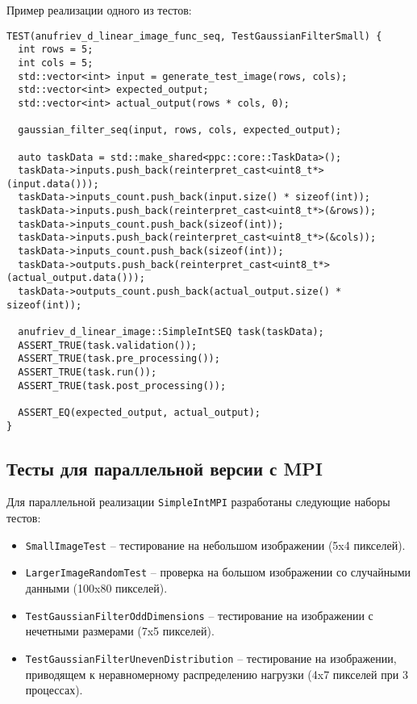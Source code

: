 \documentclass[12pt]{article}
\begin{document}
Пример реализации одного из тестов:
\begin{lstlisting}
TEST(anufriev_d_linear_image_func_seq, TestGaussianFilterSmall) {
  int rows = 5;
  int cols = 5;
  std::vector<int> input = generate_test_image(rows, cols);
  std::vector<int> expected_output;
  std::vector<int> actual_output(rows * cols, 0);

  gaussian_filter_seq(input, rows, cols, expected_output);

  auto taskData = std::make_shared<ppc::core::TaskData>();
  taskData->inputs.push_back(reinterpret_cast<uint8_t*>(input.data()));
  taskData->inputs_count.push_back(input.size() * sizeof(int));
  taskData->inputs.push_back(reinterpret_cast<uint8_t*>(&rows));
  taskData->inputs_count.push_back(sizeof(int));
  taskData->inputs.push_back(reinterpret_cast<uint8_t*>(&cols));
  taskData->inputs_count.push_back(sizeof(int));
  taskData->outputs.push_back(reinterpret_cast<uint8_t*>(actual_output.data()));
  taskData->outputs_count.push_back(actual_output.size() * sizeof(int));

  anufriev_d_linear_image::SimpleIntSEQ task(taskData);
  ASSERT_TRUE(task.validation());
  ASSERT_TRUE(task.pre_processing());
  ASSERT_TRUE(task.run());
  ASSERT_TRUE(task.post_processing());

  ASSERT_EQ(expected_output, actual_output);
}
\end{lstlisting}

\subsection{Тесты для параллельной версии с MPI}

Для параллельной реализации \texttt{SimpleIntMPI} разработаны следующие наборы тестов:

\begin{itemize}
    \item \texttt{SmallImageTest} – тестирование на небольшом изображении (5x4 пикселей).
    \item \texttt{LargerImageRandomTest} – проверка на большом изображении со случайными данными (100x80 пикселей).
    \item \texttt{TestGaussianFilterOddDimensions} – тестирование на изображении с нечетными размерами (7x5 пикселей).
    \item \texttt{TestGaussianFilterUnevenDistribution} – тестирование на изображении, приводящем к неравномерному распределению нагрузки (4x7 пикселей при 3 процессах).
\end{itemize}
\end{document}
